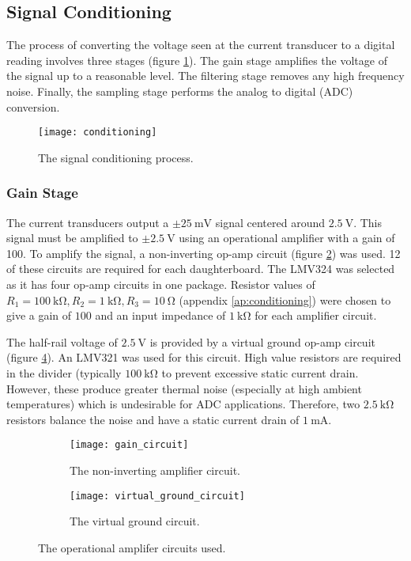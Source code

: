 \subsection{Signal Conditioning}

The process of converting the voltage seen at the current transducer to a digital reading involves three stages (figure \ref{fig:conditioning}).
The gain stage amplifies the voltage of the signal up to a reasonable level.
The filtering stage removes any high frequency noise.
Finally, the sampling stage performs the analog to digital (ADC) conversion.
\begin{figure}[H]
	\centering
	\texttt{[image: conditioning]}
	\caption{The signal conditioning process.}
	\label{fig:conditioning}
\end{figure}

\subsubsection{Gain Stage}

The current transducers output a $\pm \SI{25}{\milli\volt}$ signal centered around $\SI{2.5}{\volt}$.
This signal must be amplified to $\pm \SI{2.5}{\volt}$ using an operational amplifier with a gain of 100.
To amplify the signal, a non-inverting op-amp circuit (figure \ref{fig:non-inverting-op-amp}) was used.
12 of these circuits are required for each daughterboard.
The LMV324 was selected as it has four op-amp circuits in one package.
Resistor values of $R_1 = \SI{100}{\kilo\ohm}, R_2 = \SI{1}{\kilo\ohm}, R_3 = \SI{10}{\ohm}$ (appendix \ref{ap:conditioning}) were chosen to give a gain of $100$ and an input impedance of $\SI{1}{\kilo\ohm}$ for each amplifier circuit.

The half-rail voltage of $\SI{2.5}{\volt}$ is provided by a virtual ground op-amp circuit (figure \ref{fig:half-supply}).
An LMV321 was used for this circuit.
High value resistors are required in the divider (typically $\SI{100}{\kilo\ohm}$ to prevent excessive static current drain.
However, these produce greater thermal noise (especially at high ambient temperatures) which is undesirable for ADC applications.
Therefore, two $\SI{2.5}{\kilo\ohm}$ resistors balance the noise and have a static current drain of $\SI{1}{\milli\ampere}$.

\begin{figure}[hb]
\centering

\begin{subfigure}[c]{0.45\textwidth}
	\centering
	\texttt{[image: gain\_circuit]}
	\caption{The non-inverting amplifier circuit.}
	\label{fig:non-inverting-op-amp}
\end{subfigure}
\hfill
\begin{subfigure}[c]{0.45\textwidth}
	\centering
	\vfill
	\texttt{[image: virtual\_ground\_circuit]}
	\vfill
	\caption{The virtual ground circuit.}
	\label{fig:half-supply}
\end{subfigure}

\caption{The operational amplifer circuits used.}
\end{figure}

